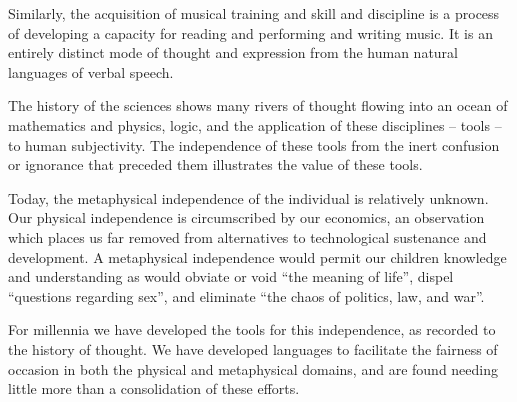 Similarly, the acquisition of musical training and skill and
discipline is a process of developing a capacity for reading and
performing and writing music.  It is an entirely distinct mode of
thought and expression from the human natural languages of verbal
speech.

The history of the sciences shows many rivers of thought flowing into
an ocean of mathematics and \break physics, logic, and the application
of these disciplines -- tools -- to human subjectivity.  The
independence of these tools from the inert confusion or ignorance that
preceded them illustrates the value of these tools.

Today, the metaphysical independence of the individual is relatively
unknown.  Our physical independence is circumscribed by our economics,
an observation which places us far removed from alternatives to
technological sustenance and development.  A metaphysical independence
would permit our children knowledge and understanding as would obviate
or void ``the meaning of life'', dispel ``questions regarding sex'',
and eliminate ``the chaos of politics, law, and war''.

For millennia we have developed the tools for this independence, as
recorded to the history of thought.  We have developed languages to
facilitate the fairness of occasion in both the physical and
metaphysical domains, and are found needing little more than a
consolidation of these efforts.

\vfill
\bye

